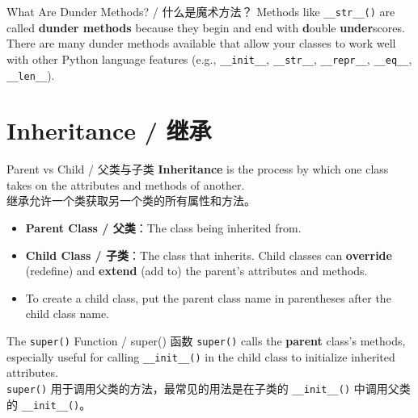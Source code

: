 \documentclass[11pt,a4paper]{report}
\let\oldtexttt\texttt
\renewcommand{\texttt}[1]{\textcolor{mainblue}{\oldtexttt{#1}}}
\begin{document}
\begin{concept}{What Are Dunder Methods? / 什么是魔术方法？}
    Methods like \texttt{\_\_str\_\_()} are called \textbf{dunder methods} because they begin and end with \textbf{d}ouble \textbf{under}scores. There are many dunder methods available that allow your classes to work well with other Python language features (e.g., \texttt{\_\_init\_\_}, \texttt{\_\_str\_\_}, \texttt{\_\_repr\_\_}, \texttt{\_\_eq\_\_}, \texttt{\_\_len\_\_}).
\end{concept}

\section{Inheritance / 继承}

\begin{concept}{Parent vs Child / 父类与子类}
    \textbf{Inheritance} is the process by which one class takes on the attributes and methods of another. \\
    继承允许一个类获取另一个类的所有属性和方法。

    \begin{itemize}[itemsep=0.5em]
        \item \textbf{Parent Class / 父类}：The class being inherited from.
        \item \textbf{Child Class / 子类}：The class that inherits. Child classes can \textbf{override} (redefine) and \textbf{extend} (add to) the parent's attributes and methods.
        \item To create a child class, put the parent class name in parentheses after the child class name.
    \end{itemize}
\end{concept}

\begin{concept}{The \texttt{super()} Function / super() 函数}
    \texttt{super()} calls the \textbf{parent} class's methods, especially useful for calling \texttt{\_\_init\_\_()} in the child class to initialize inherited attributes. \\
    \texttt{super()} 用于调用父类的方法，最常见的用法是在子类的 \texttt{\_\_init\_\_()} 中调用父类的 \texttt{\_\_init\_\_()}。
\end{concept}
\end{document}
